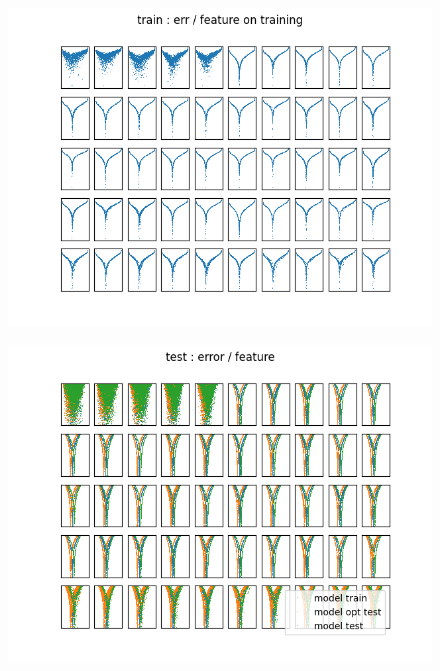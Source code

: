 \documentclass{article}
\begin{document}
\begin{figure}
\includegraphics[scale=1]{train_error_par_feature.png}
\end{figure}

\newpage

\newpage

\begin{figure}
\includegraphics[scale=1]{test_error_par_feature.png}
\end{figure}

\newpage
\end{document}
